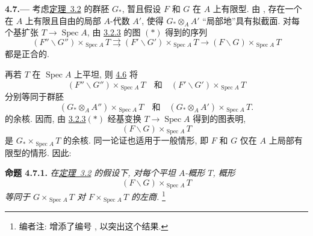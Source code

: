 
\medskip
{}\label{par:sga3-VIA-4.7}%
\noindent\textbf{4.7.---}
考虑\hyperref[thm:sga3-VIA-3.2]{定理~3.2} 的群胚 \(G_*\),
暂且假设 \(F\) 和 \(G\) 在 \(A\) 上有限型.
由 ,
存在一个在 \(A\) 上有限且自由的局部 \(A\)-代数 \(A'\),
使得 \(G_*\otimes_AA'\) “局部地”具有拟截面.
对每个基扩张 \(T\to\operatorname{Spec}A\),
由 \hyperref[diag:sga3-VIA-3.2.3-exact-descent]{3.2.3} 的图 \((*)\) 得到的序列
\[
  (F''\backslash G'')\times_{\operatorname{Spec}A}T
    \rightrightarrows
  (F'\backslash G')\times_{\operatorname{Spec}A}T
    \longrightarrow
  (F\backslash G)\times_{\operatorname{Spec}A}T
\]
都是正合的.

再若 \(T\) 在 \(\operatorname{Spec}A\) 上平坦,
则 \hyperref[par:sga3-VIA-4.6]{4.6} 将
\[
  (F''\backslash G'')\times_{\operatorname{Spec}A}T
  \quad\text{和}\quad
  (F'\backslash G')\times_{\operatorname{Spec}A}T
\]
分别等同于群胚
\[
  (G_*\otimes_AA'')\times_{\operatorname{Spec}A}T
  \quad\text{和}\quad
  (G_*\otimes_AA')\times_{\operatorname{Spec}A}T.
\]
的余核. 因而, 由 \hyperref[diag:sga3-VIA-3.2.3-exact-descent]{3.2.3}\((*)\)
经基变换 \(T\to\operatorname{Spec}A\) 得到的图表明,
\[
  (F\backslash G)\times_{\operatorname{Spec}A}T
\]
是 \(G_*\times_{\operatorname{Spec}A}T\) 的余核.
同一论证也适用于一般情形, 即 \(F\) 和 \(G\) 仅在 \(A\) 上局部有限型的情形.
因此:

\medskip
{}\label{prop:sga3-VIA-4.7.1}%
\noindent\textbf{命题 4.7.1.}
\textit{在\hyperref[thm:sga3-VIA-3.2]{定理~3.2} 的假设下,
对每个平坦 \(A\)-概形 \(T\), 概形
\[
  (F\backslash G)\times_{\operatorname{Spec}A}T
\]
等同于 \(G\times_{\operatorname{Spec}A}T\)
对 \(F\times_{\operatorname{Spec}A}T\) 的左商.}%
\footnote{\label{note:sga3-VIA-48}编者注: 增添了编号
, 以突出这个结果.}
